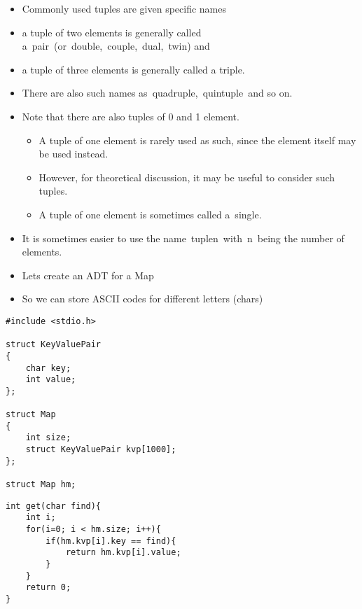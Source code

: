 \documentclass{beamer}
\begin{document}
\begin{frame}
\begin{itemize}
\item Commonly used tuples are given specific names
\bigskip
\item a tuple of two elements is generally called a~pair~(or~double,~couple,~dual,~twin) and 
\item a tuple of three elements is generally called a triple.
\item There are also such names as~quadruple,~quintuple~and so on. 
\item Note that there are also tuples of 0 and 1 element. 
\begin{itemize}
\item A tuple of one element is rarely used as such, since the element itself may be used instead. 
\item However, for theoretical discussion, it may be useful to consider such tuples. 
\item A tuple of one element is sometimes called a~single.~
\end{itemize}
\item It is sometimes easier to use the name~tuplen~with~n~being the number of elements.
\end{itemize}
\end{frame}

\begin{frame}
\begin{itemize}
\item Lets create an ADT for a Map
\item So we can store ASCII codes for different letters (chars)
\end{itemize}
\end{frame}

\begin{frame}[fragile]
\begin{block}{}
\begin{lstlisting}
#include <stdio.h>

struct KeyValuePair
{
    char key;
    int value;
}; 

struct Map
{
    int size;
    struct KeyValuePair kvp[1000];
};

struct Map hm;
\end{lstlisting}
\end{block}
\end{frame}

\begin{frame}[fragile]
\begin{block}{}
\begin{lstlisting}
int get(char find){
    int i;
    for(i=0; i < hm.size; i++){
        if(hm.kvp[i].key == find){
            return hm.kvp[i].value;
        }
    }
    return 0;
}
\end{lstlisting}
\end{block}
\end{frame}
\end{document}
